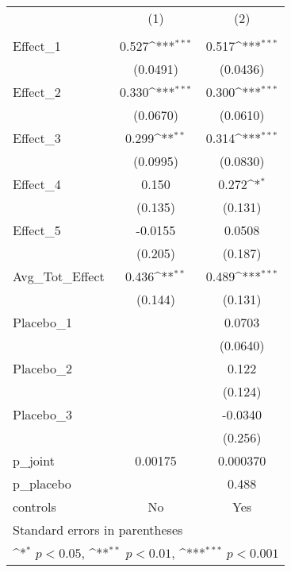 \documentclass[varwidth]{standalone}
\begin{document}
{
\def\sym#1{\ifmmode^{#1}\else\(^{#1}\)\fi}
\begin{tabular}{l*{2}{c}}
\toprule
            &\multicolumn{1}{c}{(1)}&\multicolumn{1}{c}{(2)}\\
            &\multicolumn{1}{c}{} &\multicolumn{1}{c}{} \\
\midrule
Effect\_1    &       0.527\sym{***}&       0.517\sym{***}\\
            &    (0.0491)         &    (0.0436)         \\
\addlinespace
Effect\_2    &       0.330\sym{***}&       0.300\sym{***}\\
            &    (0.0670)         &    (0.0610)         \\
\addlinespace
Effect\_3    &       0.299\sym{**} &       0.314\sym{***}\\
            &    (0.0995)         &    (0.0830)         \\
\addlinespace
Effect\_4    &       0.150         &       0.272\sym{*}  \\
            &     (0.135)         &     (0.131)         \\
\addlinespace
Effect\_5    &     -0.0155         &      0.0508         \\
            &     (0.205)         &     (0.187)         \\
\addlinespace
Avg\_Tot\_Effect&       0.436\sym{**} &       0.489\sym{***}\\
            &     (0.144)         &     (0.131)         \\
\addlinespace
Placebo\_1   &                     &      0.0703         \\
            &                     &    (0.0640)         \\
\addlinespace
Placebo\_2   &                     &       0.122         \\
            &                     &     (0.124)         \\
\addlinespace
Placebo\_3   &                     &     -0.0340         \\
            &                     &     (0.256)         \\
\midrule
p\_joint     &     0.00175         &    0.000370         \\
p\_placebo   &                     &       0.488         \\
controls    &          No         &         Yes         \\
\bottomrule
\multicolumn{3}{l}{\footnotesize Standard errors in parentheses}\\
\multicolumn{3}{l}{\footnotesize \sym{*} \(p<0.05\), \sym{**} \(p<0.01\), \sym{***} \(p<0.001\)}\\
\end{tabular}
}
\end{document}
